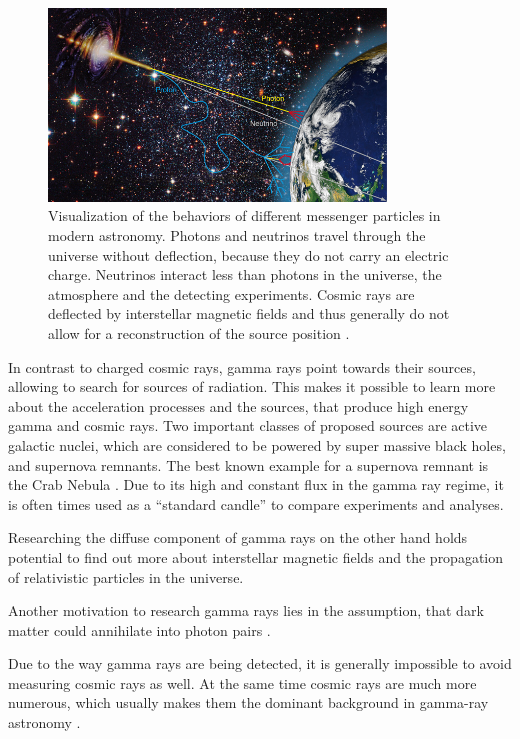 \begin{figure}
	\centering
	\captionsetup{width=0.9\linewidth}
	\includegraphics[width=0.8\textwidth]{images/astro-web-titel.jpg}
	\caption{Visualization of the behaviors of different messenger
		particles in modern astronomy.
		Photons and neutrinos travel through the universe without deflection,
		because they do not carry an electric charge.
		Neutrinos interact less than photons in the universe, the atmosphere and 
		the detecting experiments.
		Cosmic rays are deflected by interstellar
		magnetic fields and thus generally do not allow for a reconstruction
		of the source position \cite{desy_mm_astro}.
	}
	\label{fig:multi_messenger}
\end{figure}

In contrast to charged cosmic rays, gamma rays point towards
their sources, allowing to search for sources of radiation.
This makes it possible to learn more about the acceleration processes
and the sources, that produce high energy gamma and cosmic rays.
Two important classes of proposed sources are active galactic nuclei,
which are considered to be powered by super massive black holes, and 
supernova remnants. The best known example for a supernova remnant
is the Crab Nebula \cite{1989ApJ...342..379W}.
Due to its high and constant flux in the gamma ray regime,
it is often times used as a \enquote{standard candle} to compare experiments and
analyses.

Researching the diffuse component of gamma rays on the other hand holds
potential to find out more about interstellar magnetic fields and the
propagation of relativistic particles in the universe.

Another motivation to research gamma rays lies in the assumption, that
dark matter could annihilate into photon pairs \cite{Weniger_2012}.

Due to the way gamma rays are being detected, it is generally impossible
to avoid measuring cosmic rays as well.
At the same time cosmic rays are much more numerous,
which usually makes them the dominant background in gamma-ray 
astronomy \cite{funcray}.

